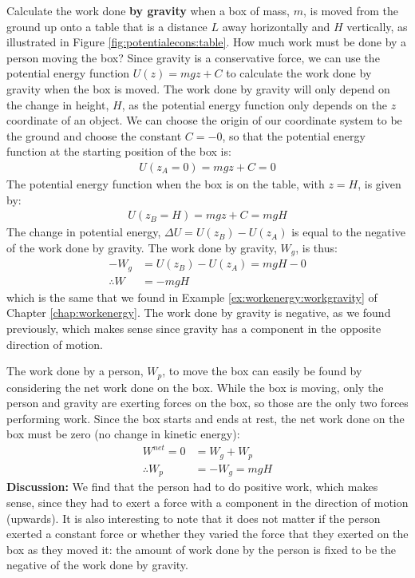 \begin{example}{
Calculate the work done \textbf{by gravity} when a box of mass, $m$, is moved from the ground up onto a table that is a distance $L$ away horizontally and $H$ vertically, as illustrated in Figure \ref{fig:potentialecons:table}. How much work must be done by a person moving the box?}
Since gravity is a conservative force, we can use the potential energy function $U(z)=mgz+C$ to calculate the work done by gravity when the box is moved. The work done by gravity will only depend on the change in height, $H$, as the potential energy function only depends on the $z$ coordinate of an object.  We can choose the origin of our coordinate system to be the ground and choose the constant $C=-0$, so that the potential energy function at the starting position of the box is:
\begin{align*}
U(z_A=0) = mgz+C= 0
\end{align*}
The potential energy function when the box is on the table, with $z=H$, is given by:
\begin{align*}
U(z_B=H) = mgz + C = mgH
\end{align*}
The change in potential energy, $\Delta U = U(z_B) - U(z_A)$ is equal to the negative of the work done by gravity. The work done by gravity, $W_g$, is thus:
\begin{align*}
-W_g &=  U(z_B) - U(z_A) = mgH - 0\\
\therefore W &= -mgH
\end{align*}
which is the same that we found in Example \ref{ex:workenergy:workgravity} of Chapter \ref{chap:workenergy}. The work done by gravity is negative, as we found previously, which makes sense since gravity has a component in the opposite direction of motion. 

The work done by a person, $W_p$, to move the box can easily be found by considering the net work done on the box. While the box is moving, only the person and gravity are exerting forces on the box, so those are the only two forces performing work. Since the box starts and ends at rest, the net work done on the box must be zero (no change in kinetic energy):
\begin{align*}
W^{net} = 0 &= W_g + W_p\\
\therefore W_p &= -W_g = mgH
\end{align*}
\textbf{Discussion:} We find that the person had to do positive work, which makes sense, since they had to exert a force with a component in the direction of motion (upwards). It is also interesting to note that it does not matter if the person exerted a constant force or whether they varied the force that they exerted on the box as they moved it: the amount of work done by the person is fixed to be the negative of the work done by gravity.
\end{example}


